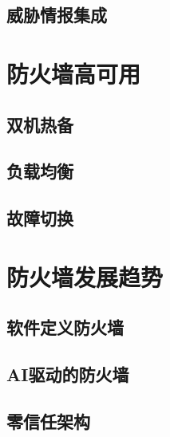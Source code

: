\documentclass[12pt,UTF8]{ctexbook}
\begin{document}
\section{威胁情报集成}

\chapter{防火墙高可用}
\section{双机热备}
\section{负载均衡}
\section{故障切换}

\chapter{防火墙发展趋势}
\section{软件定义防火墙}
\section{AI驱动的防火墙}
\section{零信任架构}

\backmatter
\end{document}
